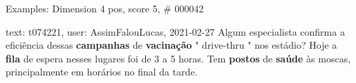\begin{frame}{Examples: Dimension 4 pos, score 5, \# 000042}
\footnotesize
\begin{exampleblock}{text: t074221, user: AssimFalouLucas, 2021-02-27}
Algum especialista confirma a eficiência dessas \textbf{campanhas} de 
\textbf{vacinação} " drive-thru " nos estádio? Hoje a \textbf{fila} de espera 
nesses lugares foi de 3 a 5 horas. Tem \textbf{postos} de \textbf{saúde} às 
moscas, principalmente em horários no final da tarde. 
\end{exampleblock}
\end{frame}
